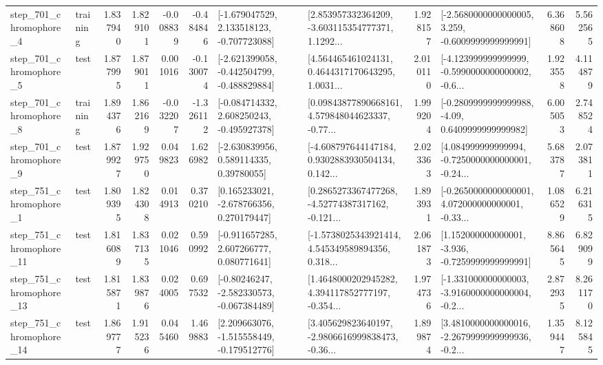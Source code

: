 \begin{tabular}{llrrrrllrlrr}
   step\_701\_chromophore\_4 &  training &      1.837940 &    1.829101 &     -0.008839 & -0.484846 &   [-1.679047529, 2.133518123, -0.707723088] &  [2.853957332364209, -3.603115354777371, 1.1292... &       1.928157 &  [-2.5680000000000005, 3.259, -0.6009999999999991] &            6.368608 &          5.562565 \\
   step\_701\_chromophore\_5 &      test &      1.877995 &    1.879011 &      0.001016 & -0.130074 &  [-2.621399058, -0.442504799, -0.488829884] &  [4.564465461024131, 0.4644317170643295, 1.0031... &       2.010110 &  [-4.123999999999999, -0.5990000000000002, -0.6... &            1.923558 &          4.114879 \\
   step\_701\_chromophore\_8 &  training &      1.894376 &    1.862169 &     -0.032207 & -1.326112 &   [-0.084714332, 2.608250243, -0.495927378] &  [0.09843877890668161, 4.579848044623337, -0.77... &       1.999204 &   [-0.2809999999999988, -4.09, 0.6409999999999982] &            6.005053 &          2.748524 \\
   step\_701\_chromophore\_9 &      test &      1.879927 &    1.929750 &      0.049823 &  1.626982 &     [-2.630839956, 0.589114335, 0.39780055] &  [-4.608797644147184, 0.9302883930504134, 0.142... &       2.023363 &  [4.084999999999994, -0.7250000000000001, -0.24... &            5.683787 &          2.073811 \\
   step\_751\_chromophore\_1 &      test &      1.809395 &    1.824308 &      0.014913 &  0.370210 &    [0.165233021, -2.678766356, 0.270179447] &  [0.2865273367477268, -4.52774387317162, -0.121... &       1.893931 &  [-0.2650000000000001, 4.072000000000001, -0.33... &            1.086529 &          6.216315 \\
  step\_751\_chromophore\_11 &      test &      1.816089 &    1.837135 &      0.021046 &  0.590992 &    [-0.911657285, 2.607266777, 0.080771641] &  [-1.5738025343921414, 4.545349589894356, 0.318... &       2.061873 &   [1.152000000000001, -3.936, -0.7259999999999991] &            8.865645 &          6.829099 \\
  step\_751\_chromophore\_13 &      test &      1.815871 &    1.839876 &      0.024005 &  0.697532 &   [-0.80246247, -2.582330573, -0.067384489] &  [1.4648000202945282, 4.394117852777197, -0.354... &       1.974736 &  [-1.331000000000003, -3.9160000000000004, -0.2... &            2.872935 &          8.261170 \\
  step\_751\_chromophore\_14 &      test &      1.869777 &    1.915236 &      0.045460 &  1.469883 &   [2.209663076, -1.515558449, -0.179512776] &  [3.405629823640197, -2.9806616999838473, -0.36... &       1.899874 &  [3.4810000000000016, -2.2679999999999936, -0.2... &            1.359447 &          8.125845 \\

\end{tabular}
